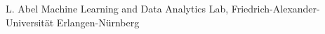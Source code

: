 
                {L. Abel}
                {Machine Learning and Data Analytics Lab, Friedrich-Alexander-Universität Erlangen-Nürnberg}
                
